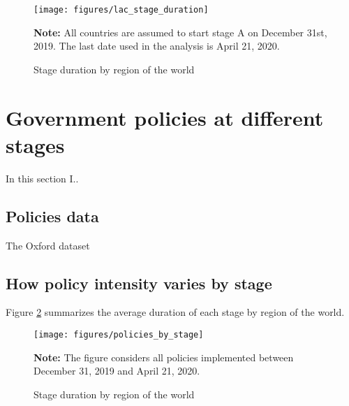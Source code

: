 \documentclass[12pt,english]{article}
\begin{document}
\begin{figure}[H]
	\singlespacing
	\centering
	 \caption{Stage duration by region of the world}  \label{fig:stage_by_region}
	\resizebox{0.7\width}{!} {
		\begin{threeparttable}

 			  \texttt{[image: figures/lac\_stage\_duration]}
  			 \begin{tablenotes}[flushleft]\vspace*{-7bp}
			\item \textbf{Note:} All countries are assumed to start stage A on December 31st, 2019.  The last date used in the analysis is April 21, 2020.
			 \end{tablenotes}
  		\end{threeparttable}
 		}
  	 \onehalfspacing
\end{figure}



\section{Government policies at different stages \label{sec:Policies}}

In this section I..

\subsection{Policies data \label{subsec:Policies-data}}

The Oxford dataset 

\subsection{How policy intensity varies by stage \label{subsec:Policies-by-stage}}

Figure \ref{fig:policies_by_stage} summarizes the average duration of each stage by region of the world. 

\begin{figure}[H]
	\singlespacing
	\centering
	 \caption{Stage duration by region of the world}  \label{fig:policies_by_stage}
	\resizebox{0.7\width}{!} {
		\begin{threeparttable}

 			  \texttt{[image: figures/policies\_by\_stage]}
  			 \begin{tablenotes}[flushleft]\vspace*{-7bp}
			\item \textbf{Note:} The figure considers all policies implemented between December 31, 2019 and April 21, 2020.
			 \end{tablenotes}
  		\end{threeparttable}
 		}
  	 \onehalfspacing
\end{figure}
\end{document}

